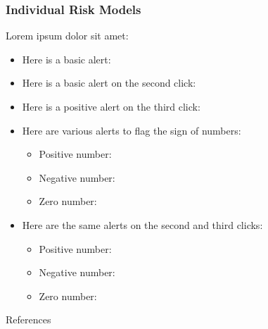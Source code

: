 \documentclass[11pt,xcolor={dvipsnames},hyperref={pdftex,pdfpagemode=UseNone,hidelinks,pdfdisplaydoctitle=true},usepdftitle=false]{beamer}
\begin{document}
\begin{frame}
    \frametitle{Individual Risk Models}
    Lorem ipsum dolor sit amet:
    \begin{itemize}
    \item Here is a basic alert: 
    \item Here is a basic alert on the second click: 
    \item Here is a positive alert on the third click: 
    \item Here are various alerts to flag the sign of numbers:
    \begin{itemize}
    \item Positive number: 
    \item Negative number: 
    \item Zero number: 
    \end{itemize}
    \item Here are the same alerts on the second and third clicks:
    \begin{itemize}
    \item Positive number: 
    \item Negative number: 
    \item Zero number: 
    \end{itemize}
    \end{itemize}
    \end{frame}

\appendix

\begin{frame}[allowframebreaks]{References}


\end{frame}


\end{document}
